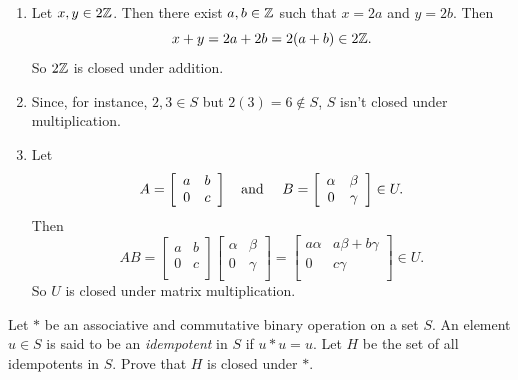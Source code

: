 \begin{solution}[print=true]
\begin{enumerate}
\item Let $x, y\in 2\mathbb{Z}$. Then there exist $a,b\in \mathbb{Z}$ such that $x=2a$ and $y=2b$.  Then $$x+y=2a+2b=2(a+b)\in 2\mathbb{Z}.$$ So $2\mathbb{Z}$ is closed under addition.
\item Since, for instance, $2,3\in S$ but $2(3)=6\not\in S$, $S$ isn't closed under multiplication.
\item Let $$A=\left[
          \begin{array}{cc}
            a & b \\
            0 & c \\
          \end{array}
        \right] \mbox{\quad and \quad}B=\left[
          \begin{array}{cc}
            \alpha & \beta \\
            0 & \gamma \\
          \end{array}
        \right]\in U.$$ Then $$AB=\left[
          \begin{array}{cc}
            a & b \\
            0 & c \\
          \end{array}
        \right]\left[
          \begin{array}{cc}
            \alpha & \beta \\
            0 & \gamma \\
          \end{array}
        \right]=\left[
          \begin{array}{cc}
            a\alpha & a\beta+b\gamma \\
            0 & c\gamma \\
          \end{array}
        \right]\in U.$$ So $U$ is closed under matrix multiplication.

\end{enumerate}
\end{solution}

\begin{exercise}[ID=2H]
 Let $*$ be an associative and commutative binary operation on a set $S$. An element $u\in S$ is said to be an \textit{idempotent} in $S$ if $u*u=u$. Let $H$ be the set of all idempotents in $S$.  Prove that $H$ is closed under $*$.
\end{exercise}

